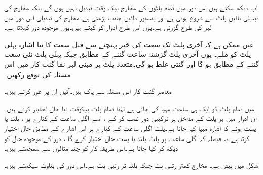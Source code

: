 آپ دیکھ سکتے ہیں اس دور میں تمام پلٹوں کے مخارج بیک وقت تبدیل نہیں ہوں گے  بلکہ مخارج کی تبدیلی بائیں پلٹ سے شروع ہوتی ہے اور بدستور دائیں جانب بڑھتی ہے۔مخارج کی تبدیلی اس دور میں لہر کی طرح گزرتی ہے۔یوں اس طرح ادوار کو  کہتے ہیں۔یوں  موجودہ دور کہلاتا   ہے۔

عین ممکن ہے کہ آخری پلٹ تک سعت کی خبر پہنچنے سے قبل  سعت کا نیا اشارہ پہلی پلٹ کو ملے۔  یوں  آخری پلٹ گزشتہ ساعت گننے  کے مطابق جبکہ پہلی پلٹ نئی سعت   گننے کے مطابق ہو گا اور گنتی غلط ہو گی۔متعدد پلٹ پر مبنی لہر نما گنت کار میں اس مسئلہ کی توقع    رکھیں۔ 

 معاصر گنت کار اس مسئلہ سے پاک ہیں۔آئیں ان پر غور کرتے ہیں۔
 
 میں تمام پلٹ کو ایک ہی ساعت مہیا کی جاتی ہے لہٰذا  تمام پلٹ  بیکوقت نیا حال  اختیار کرتے ہیں۔ان   ادوار میں ہر پلٹ کے مداخل پر ترکیبی دور نصب کر  کے ، اسے اگلی  ساعت کے کنارے پر ، بلند یا پست ہونے کا   اشارہ مہیا کیا جاتا ہے۔پلٹ  اگلی ساعت کے کنارے پر  اس اشارے کے مطابق حال اختیار کرتا  ہے۔یہ فیصلہ کہ اگلی ساعت پر پلٹ بلند یا  پست حال اختیار کرے گا ، دور کے موجودہ حال کو دیکھ کر کیا جاتا ہے۔اس طریقہ کار کو چند مثالوں سے سمجھتے ہیں۔

 شکل  میں پیش ہے۔  مخارج   کمتر  رتبی بِٹ   جبکہ  بلند تر رتبی بِٹ ہے۔اس دور کی بناوٹ سیکھتے  ہیں۔



